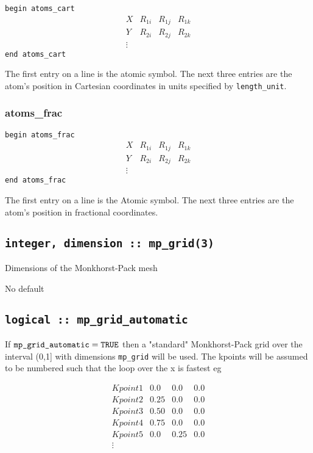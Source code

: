 \noindent \verb#begin atoms_cart#
$$
\begin{array}{cccc}
X  & R_{1i} & R_{1j} & R_{1k} \\
Y  & R_{2i} & R_{2j} & R_{2k} \\
\vdots
\end{array}
$$
\verb#end atoms_cart#


The first entry on a line is the atomic symbol. The next three entries
are the atom's position in Cartesian coordinates in units specified by
\verb#length_unit#.

\subsubsection{atoms\_frac}

\noindent \verb#begin atoms_frac#
$$
\begin{array}{cccc}
X  & R_{1i} & R_{1j} & R_{1k} \\
Y  & R_{2i} & R_{2j} & R_{2k} \\
\vdots
\end{array}
$$
\verb#end atoms_frac#

The first entry on a line is the Atomic symbol. The next three entries
are the atom's position in fractional coordinates.


\subsection[mp\_grid]{\tt integer, dimension :: mp\_grid(3)}
Dimensions of the Monkhorst-Pack mesh

No default

\subsection[mp\_grid\_automatic]{\tt logical :: mp\_grid\_automatic}

If
$\verb#mp_grid_automatic#=\verb#TRUE#$
then a "standard" Monkhorst-Pack grid over the interval (0,1] with dimensions \verb#mp_grid#
will be used. The kpoints will be assumed to be numbered such that the
loop over the x is fastest eg

$$
\begin{array}{cccc}
Kpoint 1 &  0.0 & 0.0& 0.0 \\
Kpoint 2 & 0.25 &0.0 & 0.0 \\
Kpoint 3 & 0.50 &0.0 & 0.0 \\
Kpoint 4 & 0.75 &0.0 & 0.0 \\
Kpoint 5 & 0.0  &0.25& 0.0 \\
\vdots
\end{array}
$$


